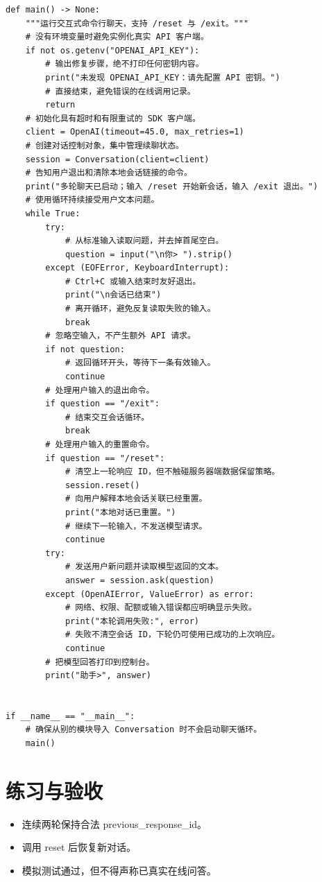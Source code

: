 \documentclass[UTF8,11pt,a4paper]{ctexart}
\begin{document}
\begin{Verbatim}[fontsize=\scriptsize,breaklines=true,breakanywhere=true]
def main() -> None:
    """运行交互式命令行聊天，支持 /reset 与 /exit。"""
    # 没有环境变量时避免实例化真实 API 客户端。
    if not os.getenv("OPENAI_API_KEY"):
        # 输出修复步骤，绝不打印任何密钥内容。
        print("未发现 OPENAI_API_KEY：请先配置 API 密钥。")
        # 直接结束，避免错误的在线调用记录。
        return
    # 初始化具有超时和有限重试的 SDK 客户端。
    client = OpenAI(timeout=45.0, max_retries=1)
    # 创建对话控制对象，集中管理续聊状态。
    session = Conversation(client=client)
    # 告知用户退出和清除本地会话链接的命令。
    print("多轮聊天已启动；输入 /reset 开始新会话，输入 /exit 退出。")
    # 使用循环持续接受用户文本问题。
    while True:
        try:
            # 从标准输入读取问题，并去掉首尾空白。
            question = input("\n你> ").strip()
        except (EOFError, KeyboardInterrupt):
            # Ctrl+C 或输入结束时友好退出。
            print("\n会话已结束")
            # 离开循环，避免反复读取失败的输入。
            break
        # 忽略空输入，不产生额外 API 请求。
        if not question:
            # 返回循环开头，等待下一条有效输入。
            continue
        # 处理用户输入的退出命令。
        if question == "/exit":
            # 结束交互会话循环。
            break
        # 处理用户输入的重置命令。
        if question == "/reset":
            # 清空上一轮响应 ID，但不触碰服务器端数据保留策略。
            session.reset()
            # 向用户解释本地会话关联已经重置。
            print("本地对话已重置。")
            # 继续下一轮输入，不发送模型请求。
            continue
        try:
            # 发送用户新问题并读取模型返回的文本。
            answer = session.ask(question)
        except (OpenAIError, ValueError) as error:
            # 网络、权限、配额或输入错误都应明确显示失败。
            print("本轮调用失败:", error)
            # 失败不清空会话 ID，下轮仍可使用已成功的上次响应。
            continue
        # 把模型回答打印到控制台。
        print("助手>", answer)


if __name__ == "__main__":
    # 确保从别的模块导入 Conversation 时不会启动聊天循环。
    main()
\end{Verbatim}
\section{练习与验收}
\begin{itemize}
\item 连续两轮保持合法 previous\_response\_id。
\item 调用 reset 后恢复新对话。
\item 模拟测试通过，但不得声称已真实在线问答。
\end{itemize}
\end{document}
